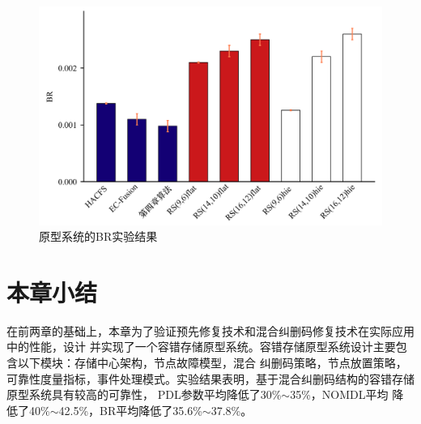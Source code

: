 \begin{figure}[htbp]
	\centering
	\includegraphics [scale=0.06]{figures/5-6.jpg}
	\caption{原型系统的BR实验结果}
	\label{fig:5-6}
\end{figure}



\section{本章小结}
在前两章的基础上，本章为了验证预先修复技术和混合纠删码修复技术在实际应用中的性能，设计
并实现了一个容错存储原型系统。容错存储原型系统设计主要包含以下模块：存储中心架构，节点故障模型，混合
纠删码策略，节点放置策略，可靠性度量指标，事件处理模式。实验结果表明，基于混合纠删码结构的容错存储原型系统具有较高的可靠性，
PDL参数平均降低了30\%$\sim$35\%，NOMDL平均
降低了40\%$\sim$42.5\%，BR平均降低了35.6\%$\sim$37.8\%。

